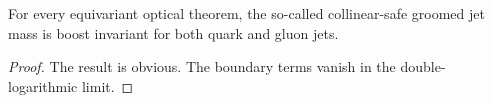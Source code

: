 \begin{lemma}[Resummation]\label{thm:2}
For every equivariant optical theorem, the so-called collinear-safe
groomed jet mass is boost invariant for both quark and gluon jets.
\end{lemma}

\begin{proof}
The result is obvious. The boundary terms vanish in the
double-logarithmic limit.
\end{proof}

